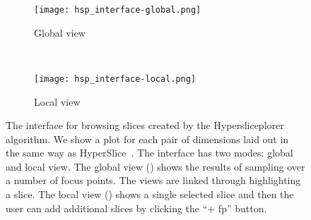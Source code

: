 
\begin{figure}
  \centering
  \begin{subfigure}[b]{0.45\linewidth}
    \texttt{[image: hsp\_interface-global.png]}
    \caption{Global view}
    \label{fig:interface:global} 
  \end{subfigure} 
  ~
  \begin{subfigure}[b]{0.45\linewidth}
    \texttt{[image: hsp\_interface-local.png]}
    \caption{Local view}
    \label{fig:interface:local} 
  \end{subfigure}
  \caption{%
    The interface for browsing slices created by the Hypersliceplorer algorithm.
    We show a plot for each pair of dimensions laid out in the same way as
    HyperSlice~\cite{Wijk:1993}.
    The interface has two modes: global and local view.
    The global view () 
    shows the results of sampling over a number of focus points. The views
    are linked through highlighting a slice. The local view 
    () shows a single selected slice and then
    the user can add additional slices by clicking the ``+ fp'' button.
  }
  \label{fig:interface}
\end{figure}









